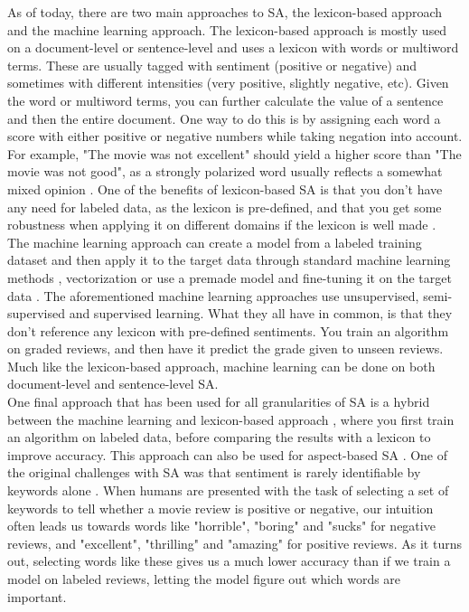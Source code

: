 \documentclass{report}
\begin{document}
As of today, there are two main approaches to SA, the lexicon-based approach and the machine learning approach. The lexicon-based approach is mostly used on a document-level or sentence-level and uses a lexicon with words or multiword terms. These are usually tagged with sentiment (positive or negative) and sometimes with different intensities (very positive, slightly negative, etc). Given the word or multiword terms, you can further calculate the value of a sentence and then the entire document. One way to do this is by assigning each word a score with either positive or negative numbers while taking negation into account. For example, "The movie was not excellent" should yield a higher score than "The movie was not good", as a strongly polarized word usually reflects a somewhat mixed opinion \cite{taboada-etal-2011-lexicon}. One of the benefits of lexicon-based SA is that you don't have any need for labeled data, as the lexicon is pre-defined, and that you get some robustness when applying it on different domains if the lexicon is well made \cite{taboada-etal-2011-lexicon}.\\
The machine learning approach can create a model from a labeled training dataset and then apply it to the target data through standard machine learning methods \cite{pang-etal-2002-thumbs}, vectorization \cite{Peters:2018, mikolov2013efficient, pennington2014glove} or use a premade model and fine-tuning it on the target data \cite{DBLP:journals/corr/abs-1810-04805}. The aforementioned machine learning approaches use unsupervised, semi-supervised and supervised learning. What they all have in common, is that they don't reference any lexicon with pre-defined sentiments. You train an algorithm on graded reviews, and then have it predict the grade given to unseen reviews. Much like the lexicon-based approach, machine learning can be done on both document-level and sentence-level SA.\\
One final approach that has been used for all granularities of SA is a hybrid between the machine learning and lexicon-based approach \cite{zhang2011combining}, where you first train an algorithm on labeled data, before comparing the results with a lexicon to improve accuracy. This approach can also be used for aspect-based SA \cite{brun2016xrce}.
One of the original challenges with SA was that sentiment is rarely identifiable by keywords alone \cite{pang-etal-2002-thumbs}. When humans are presented with the task of selecting a set of keywords to tell whether a movie review is positive or negative, our intuition often leads us towards words like "horrible", "boring" and "sucks" for negative reviews, and "excellent", "thrilling" and "amazing" for positive reviews. As it turns out, selecting words like these gives us a much lower accuracy than if we train a model on labeled reviews, letting the model figure out which words are important. 
\\
\end{document}
